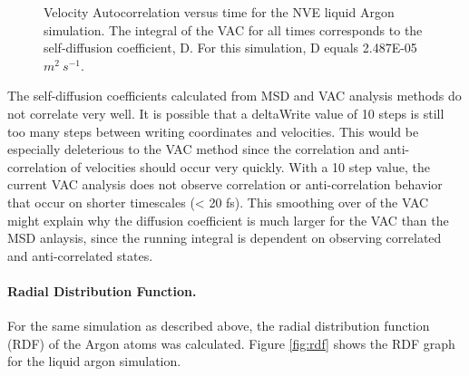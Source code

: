 \documentclass[12pt, letterpaper]{article}
\begin{document}
\begin{figure} [p]
	\centering
	\caption{Velocity Autocorrelation versus time for the NVE liquid Argon simulation. The integral of the VAC for all times corresponds to the self-diffusion coefficient, D. For this simulation, D equals 2.487E-05 $m^{2}\ s^{-1}$.}
	\label{fig:vac}
\end{figure}

The self-diffusion coefficients calculated from MSD and VAC analysis methods do not correlate very well. It is possible that a deltaWrite value of 10 steps is still too many steps between writing coordinates and velocities. This would be especially deleterious to the VAC method since the correlation and anti-correlation of velocities should occur very quickly. With a 10 step value, the current VAC analysis does not observe correlation or anti-correlation behavior that occur on shorter timescales (< 20 fs). This smoothing over of the VAC might explain why the diffusion coefficient is much larger for the VAC than the MSD anlaysis, since the running integral is dependent on observing correlated and anti-correlated states. 

\paragraph{Radial Distribution Function.}
For the same simulation as described above, the radial distribution function (RDF) of the Argon atoms was calculated. Figure \ref{fig:rdf} shows the RDF graph for the liquid argon simulation. 
\end{document}
